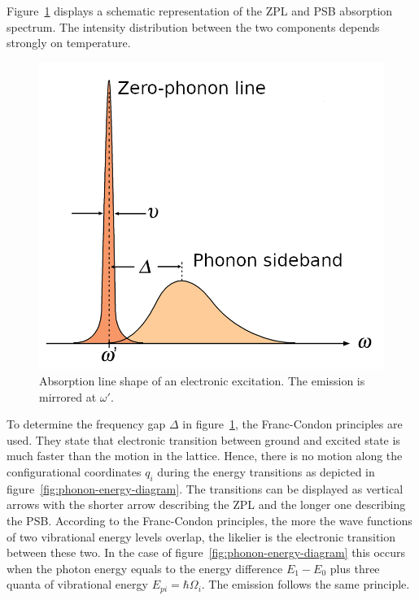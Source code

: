 Figure~\ref{fig:line-shape} displays a schematic representation of the \ac{ZPL} and \ac{PSB} absorption spectrum.
The intensity distribution between the two components depends strongly on temperature.
\begin{figure}[H]
	\centering
	\includegraphics[width=0.6\linewidth]{figures/quantum-dot/Line-shape}
	\caption[Absorption line shape of an electronic excitation.]{Absorption line shape of an electronic excitation.
		The emission is mirrored at $\omega'$.}
	\label{fig:line-shape}
\end{figure}
To determine the frequency gap $\Delta$ in figure~\ref{fig:line-shape}, the Franc-Condon principles are used.
They state that electronic transition between ground and excited state is much faster than the motion in the lattice.
Hence, there is no motion along the configurational coordinates $q_i$ during the energy transitions as depicted in figure~\ref{fig:phonon-energy-diagram}.
The transitions can be displayed as vertical arrows with the shorter arrow describing the \ac{ZPL} and the longer one describing the \ac{PSB}.
According to the Franc-Condon principles, the more the wave functions of two vibrational energy levels overlap, the likelier is the electronic transition between these two.
In the case of figure~\ref{fig:phonon-energy-diagram} this occurs when the photon energy equals to the energy difference $E_1-E_0$ plus three quanta of vibrational energy $E_{pi} = \hbar \Omega_i$.
The emission follows the same principle.
